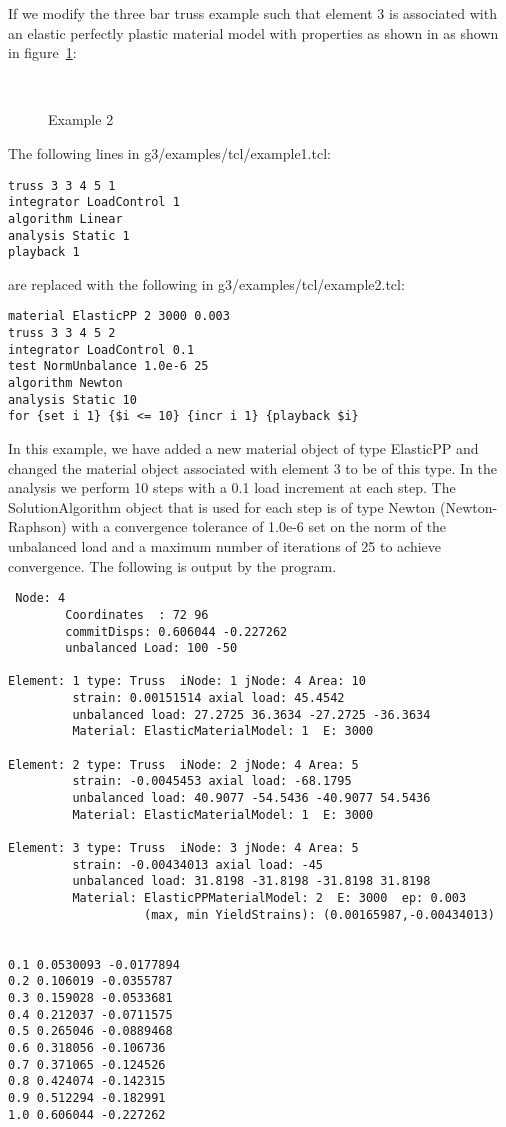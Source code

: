 \documentclass[12pt]{article}
\begin{document}
If we modify the three bar truss example such that element 3 is
associated with an elastic perfectly plastic material model with
properties as shown in as shown in figure~\ref{example2}:

\begin{figure}[htpb]
\begin{center}
\leavevmode
\hbox{%
}
\end{center}
\caption{Example 2}
\label{example2}
\end{figure}

\noindent The following lines in {\sf g3/examples/tcl/example1.tcl}:
{\sf\small
\begin{verbatim}
truss 3 3 4 5 1
integrator LoadControl 1
algorithm Linear
analysis Static 1
playback 1
\end{verbatim}
}

\noindent are replaced with the following in {\sf g3/examples/tcl/example2.tcl}:

{\sf\small
\begin{verbatim}
material ElasticPP 2 3000 0.003
truss 3 3 4 5 2
integrator LoadControl 0.1
test NormUnbalance 1.0e-6 25
algorithm Newton
analysis Static 10
for {set i 1} {$i <= 10} {incr i 1} {playback $i}
\end{verbatim}
}

In this example, we have added a new material object of type ElasticPP and changed the
material object associated with element 3 to be of this type. In the
analysis we perform 10 steps with a 0.1 load increment at each step. The
SolutionAlgorithm object that is used for each step is of type Newton
(Newton-Raphson) with a convergence tolerance of 1.0e-6 set on the
norm of the unbalanced load and a maximum number of iterations of 25
to achieve convergence. The following is output by the program.

{\sf\small
\begin{verbatim}
 Node: 4
        Coordinates  : 72 96 
        commitDisps: 0.606044 -0.227262 
        unbalanced Load: 100 -50 

Element: 1 type: Truss  iNode: 1 jNode: 4 Area: 10 
         strain: 0.00151514 axial load: 45.4542 
         unbalanced load: 27.2725 36.3634 -27.2725 -36.3634 
         Material: ElasticMaterialModel: 1  E: 3000

Element: 2 type: Truss  iNode: 2 jNode: 4 Area: 5 
         strain: -0.0045453 axial load: -68.1795 
         unbalanced load: 40.9077 -54.5436 -40.9077 54.5436 
         Material: ElasticMaterialModel: 1  E: 3000

Element: 3 type: Truss  iNode: 3 jNode: 4 Area: 5 
         strain: -0.00434013 axial load: -45 
         unbalanced load: 31.8198 -31.8198 -31.8198 31.8198 
         Material: ElasticPPMaterialModel: 2  E: 3000  ep: 0.003 
                   (max, min YieldStrains): (0.00165987,-0.00434013)


0.1 0.0530093 -0.0177894 
0.2 0.106019 -0.0355787 
0.3 0.159028 -0.0533681 
0.4 0.212037 -0.0711575 
0.5 0.265046 -0.0889468 
0.6 0.318056 -0.106736 
0.7 0.371065 -0.124526 
0.8 0.424074 -0.142315 
0.9 0.512294 -0.182991 
1.0 0.606044 -0.227262 
\end{verbatim}
}
\end{document}
